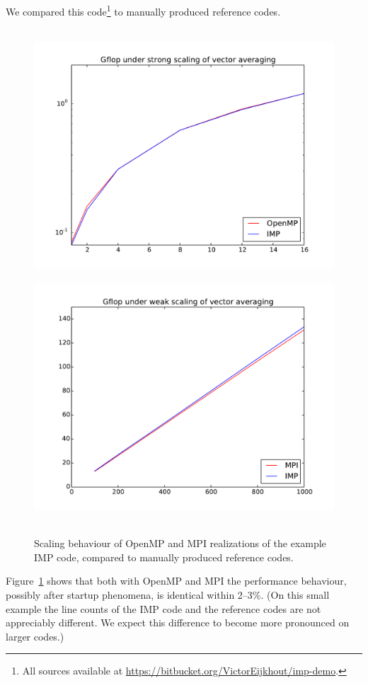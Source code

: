 We compared this code\footnote{All sources available
at \url{https://bitbucket.org/VictorEijkhout/imp-demo}.} to manually
produced reference codes.
\begin{figure}[ht]
\leavevmode\hbox{%
  \includegraphics[scale=.4]{graphics/omp_scaling}
  \includegraphics[scale=.4]{graphics/mpi_scaling}
  }
  \caption{Scaling behaviour of OpenMP and MPI realizations of the example IMP code,
  compared to manually produced reference codes.}
  \label{fig:scale}
\end{figure}
Figure~\ref{fig:scale} shows that both with OpenMP and MPI the 
performance behaviour,
possibly after startup phenomena,
is identical within 2--3\%. (On this small example
the line counts of the IMP code and the reference codes
are not appreciably different. We expect
this difference to become more pronounced on
larger codes.)
